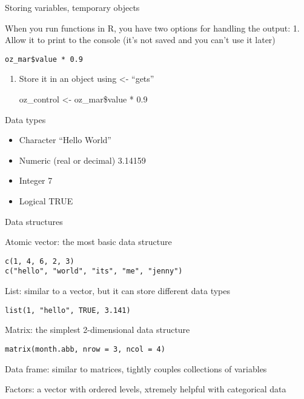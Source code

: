 \documentclass[ignorenonframetext,]{beamer}
\providecommand{\tightlist}{%
  \setlength{\itemsep}{0pt}\setlength{\parskip}{0pt}}
\begin{document}
\begin{frame}[fragile]{Storing variables, temporary objects}

When you run functions in R, you have two options for handling the
output: 1. Allow it to print to the console (it's not saved and you
can't use it later)

\begin{verbatim}
oz_mar$value * 0.9
\end{verbatim}

\begin{enumerate}
\def\labelenumi{\arabic{enumi}.}
\item
  Store it in an object using \textless{}- ``gets''

  oz\_control \textless{}- oz\_mar\$value * 0.9
\end{enumerate}

\end{frame}

\begin{frame}{Data types}

\begin{itemize}
\tightlist
\item
  Character ``Hello World''
\item
  Numeric (real or decimal) 3.14159
\item
  Integer 7
\item
  Logical TRUE
\end{itemize}

\end{frame}

\begin{frame}[fragile]{Data structures}

Atomic vector: the most basic data structure

\begin{verbatim}
c(1, 4, 6, 2, 3)
c("hello", "world", "its", "me", "jenny")
\end{verbatim}

List: similar to a vector, but it can store different data types

\begin{verbatim}
list(1, "hello", TRUE, 3.141)
\end{verbatim}

Matrix: the simplest 2-dimensional data structure

\begin{verbatim}
matrix(month.abb, nrow = 3, ncol = 4)
\end{verbatim}

Data frame: similar to matrices, tightly couples collections of
variables

Factors: a vector with ordered levels, xtremely helpful with categorical
data

\end{frame}
\end{document}
